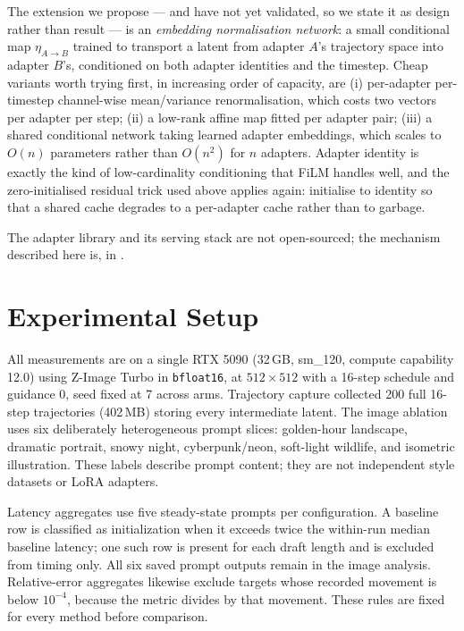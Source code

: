 \documentclass[11pt,a4paper]{article}
\begin{document}
The extension we propose --- and have not yet validated, so we state it as
design rather than result --- is an \emph{embedding normalisation network}: a
small conditional map $\eta_{A \to B}$ trained to transport a latent from
adapter $A$'s trajectory space into adapter $B$'s, conditioned on both adapter
identities and the timestep. Cheap variants worth trying first, in increasing
order of capacity, are (i) per-adapter per-timestep channel-wise
mean/variance renormalisation, which costs two vectors per adapter per step;
(ii) a low-rank affine map fitted per adapter pair; (iii) a shared conditional
network taking learned adapter embeddings, which scales to $O(n)$ parameters
rather than $O(n^2)$ for $n$ adapters. Adapter identity is exactly the kind of
low-cardinality conditioning that FiLM handles well, and the zero-initialised
residual trick used above applies again: initialise to identity so that a shared
cache degrades to a per-adapter cache rather than to garbage.

The adapter library and its serving stack are not open-sourced; the mechanism
described here is, in \citet{cutedsl}.

\section{Experimental Setup}

All measurements are on a single RTX 5090 (32\,GB, sm\_120, compute capability
12.0) using Z-Image Turbo in \texttt{bfloat16}, at $512\times512$ with a 16-step
schedule and guidance 0, seed fixed at 7 across arms. Trajectory capture
collected 200 full 16-step trajectories (402\,MB) storing every intermediate
latent. The image ablation uses six deliberately heterogeneous prompt slices:
golden-hour landscape, dramatic portrait, snowy night, cyberpunk/neon,
soft-light wildlife, and isometric illustration. These labels describe prompt
content; they are not independent style datasets or LoRA adapters.

Latency aggregates use five steady-state prompts per configuration. A baseline
row is classified as initialization when it exceeds twice the within-run median
baseline latency; one such row is present for each draft length and is excluded
from timing only. All six saved prompt outputs remain in the image analysis.
Relative-error aggregates likewise exclude targets whose recorded movement is
below $10^{-4}$, because the metric divides by that movement. These rules are
fixed for every method before comparison.
\end{document}
